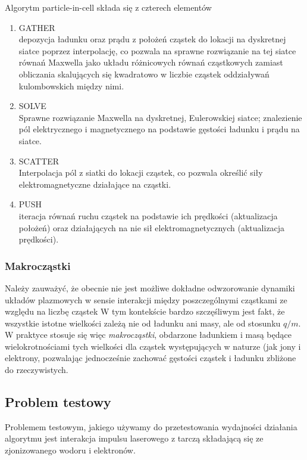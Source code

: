 Algorytm particle-in-cell składa się z czterech elementów %
\begin{enumerate}
\item GATHER \\
depozycja ładunku oraz prądu z położeń cząstek do lokacji na dyskretnej siatce poprzez interpolację,
co pozwala na sprawne rozwiązanie na tej siatce
równań Maxwella jako układu różnicowych równań cząstkowych zamiast obliczania skalujących się kwadratowo w liczbie cząstek
oddziaływań kulombowskich między nimi.
\item SOLVE \\
Sprawne rozwiązanie Maxwella na dyskretnej, Eulerowskiej siatce; znalezienie pól elektrycznego i magnetycznego
na podstawie gęstości ładunku i prądu na siatce.
\item SCATTER \\
Interpolacja pól z siatki do lokacji cząstek, co pozwala określić siły elektromagnetyczne działające na cząstki.
\item PUSH \\
iteracja równań ruchu cząstek na podstawie ich prędkości (aktualizacja położeń)
oraz działających na nie sił elektromagnetycznych (aktualizacja prędkości).
\end{enumerate}

\subsubsection{Makrocząstki}
Należy zauważyć, że obecnie nie jest możliwe dokładne odwzorowanie dynamiki układów plazmowych w sensie interakcji
między poszczególnymi cząstkami ze względu na liczbę cząstek %
W tym kontekście bardzo szczęśliwym jest fakt, że wszystkie istotne wielkości zależą nie od ładunku ani masy,
ale od stosunku $q/m$. W praktyce stosuje się więc \emph{makrocząstki}, obdarzone ładunkiem i masą będące wielokrotnościami
tych wielkości dla cząstek występujących w naturze (jak jony i elektrony, pozwalając jednocześnie zachować gęstości
cząstek i ładunku %
zbliżone do rzeczywistych.

\subsection{Problem testowy}

Problemem testowym, jakiego używamy do przetestowania wydajności działania algorytmu jest
interakcja impulsu laserowego z tarczą składającą się ze zjonizowanego wodoru i elektronów.

